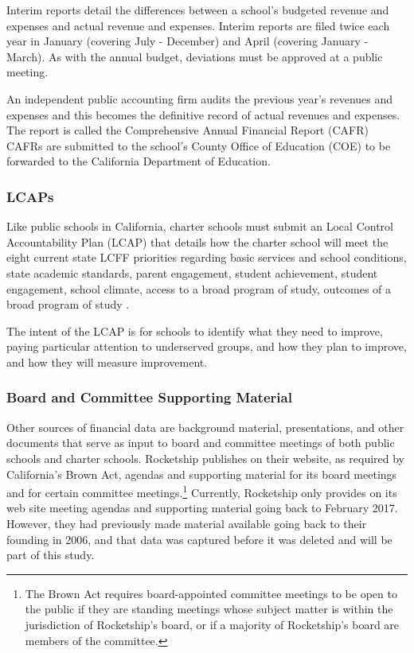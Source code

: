 Interim reports detail the differences between a school's budgeted revenue and expenses and actual revenue and expenses. Interim reports are filed twice each year in January (covering July - December) and April (covering January - March). As with the annual budget, deviations must be approved at a public meeting.

An independent public accounting firm audits the previous year's revenues and expenses and this becomes the definitive record of actual revenues and expenses. The report is called the Comprehensive Annual Financial Report (CAFR)  CAFRs are submitted to the school's County Office of Education (COE) to be forwarded to the California Department of Education.

\subsubsection{LCAPs}\label{sec:cs-lcaps}\indent%

Like public schools in California, charter schools must submit an Local Control Accountability Plan (LCAP) that details how the charter school will meet the eight current state LCFF priorities regarding basic services and school conditions, state academic standards, parent engagement, student achievement, student engagement, school climate, access to a broad program of study, outcomes of a broad program of study \parencite[67–68]{Aguinaldo.etal2023}.

The intent of the LCAP is for schools to identify what they need to improve, paying particular attention to underserved groups, and how they plan to improve, and how they will measure improvement. 

\subsubsection{Board and Committee Supporting Material}\label{sec:board-committee-packets}\indent%

Other sources of financial data are background material, presentations, and other documents that serve as input to board and committee meetings of both public schools and charter schools.  Rocketship publishes on their website, as required by California's Brown Act, agendas and supporting material for its board meetings and for certain committee meetings.\footnote{The Brown Act requires board-appointed committee meetings to be open to the public if they are standing meetings whose subject matter is within the jurisdiction of Rocketship's board, or if a majority of Rocketship's board are members of the committee.} Currently, Rocketship only provides on its web site meeting agendas and supporting material going back to February 2017. However, they had previously made material available going back to their founding in 2006, and that data was captured before it was deleted and will be part of this study.

